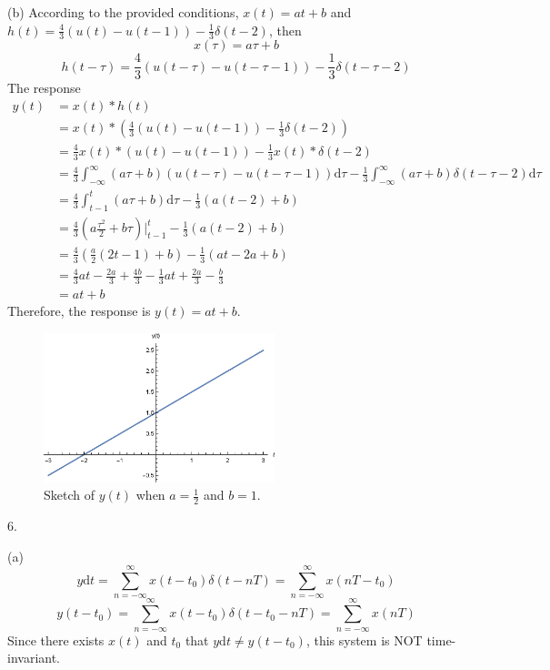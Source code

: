 \documentclass[a4paper]{article}
\begin{document}
(b) According to the provided conditions, $x(t)=at+b$ and $h(t)=\frac{4}{3}(u(t)-u(t-1))-\frac{1}{3}\delta(t-2)$, then
$$x(\tau)=a\tau+b$$
$$h(t-\tau)=\frac{4}{3}(u(t-\tau)-u(t-\tau-1))-\frac{1}{3}\delta(t-\tau-2)$$
The response
\begin{align*}
    y(t)&=x(t)*h(t)\\
    &=x(t)*(\frac{4}{3}(u(t)-u(t-1))-\frac{1}{3}\delta(t-2))\\
    &=\frac{4}{3}x(t)*(u(t)-u(t-1))-\frac{1}{3}x(t)*\delta(t-2)\\
    &=\frac{4}{3}\int_{-\infty}^\infty(a\tau+b)(u(t-\tau)-u(t-\tau-1))\mathrm{d}\tau-\frac{1}{3}\int_{-\infty}^\infty(a\tau+b)\delta(t-\tau-2)\mathrm{d}\tau\\
    &=\frac{4}{3}\int_{t-1}^t(a\tau+b)\mathrm{d}\tau-\frac{1}{3}(a(t-2)+b)\\
    &=\frac{4}{3}(a\frac{\tau^2}{2}+b\tau)\bigg|_{t-1}^t-\frac{1}{3}(a(t-2)+b)\\
    &=\frac{4}{3}(\frac{a}{2}(2t-1)+b)-\frac{1}{3}(at-2a+b)\\
    &=\frac{4}{3}at-\frac{2a}{3}+\frac{4b}{3}-\frac{1}{3}at+\frac{2a}{3}-\frac{b}{3}\\
    &=at+b
\end{align*}
Therefore, the response is $\boxed{y(t)=at+b}$.
\begin{figure}[H]
    \begin{center}
        \includegraphics[width=0.6\textwidth]{5(b).eps}
    \end{center}
    \caption{Sketch of $y(t)$ when $a=\frac{1}{2}$ and $b=1$.}
\end{figure}

6.

(a)
$$y\mathrm{d}t=\sum_{n=-\infty}^\infty x(t-t_0)\delta(t-nT)=\sum_{n=-\infty}^\infty x(nT-t_0)$$
$$y(t-t_0)=\sum_{n=-\infty}^\infty x(t-t_0)\delta(t-t_0-nT)=\sum_{n=-\infty}^\infty x(nT)$$
Since there exists $x(t)$ and $t_0$ that $y\mathrm{d}t\neq y(t-t_0)$, this system is NOT time-invariant.
\end{document}
